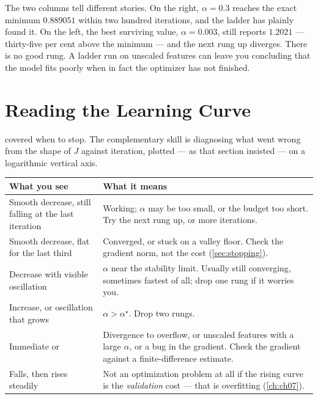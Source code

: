 The two columns tell different stories. On the right, $\alpha = 0.3$ reaches the
exact minimum $0.889051$ within two hundred iterations, and the ladder has
plainly found it. On the left, the best surviving value, $\alpha = 0.003$, still
reports $1.2021$ --- thirty-five per cent above the minimum --- and the next rung
up diverges. There is no good rung. A ladder run on unscaled features can leave
you concluding that the model fits poorly when in fact the optimizer has not
finished.

\section{Reading the Learning Curve}
\label{sec:learning-curve}

 covered when to stop. The complementary skill is diagnosing
what went wrong from the shape of $J$ against iteration, plotted --- as that
section insisted --- on a logarithmic vertical axis.

\begin{center}
\small
\renewcommand{\arraystretch}{1.3}
\begin{tabular}{@{}L{4.0cm}L{7.0cm}@{}}
\toprule
\textbf{What you see} & \textbf{What it means}\\
\midrule
Smooth decrease, still falling at the last iteration &
  Working; $\alpha$ may be too small, or the budget too short. Try the next rung
  up, or more iterations.\\
Smooth decrease, flat for the last third &
  Converged, or stuck on a valley floor. Check the gradient norm, not the cost
  (\cref{sec:stopping}).\\
Decrease with visible oscillation &
  $\alpha$ near the stability limit. Usually still converging, sometimes fastest
  of all; drop one rung if it worries you.\\
Increase, or oscillation that grows &
  $\alpha > \alpha^\star$. Drop two rungs.\\
Immediate  or  &
  Divergence to overflow, or unscaled features with a large $\alpha$, or a bug
  in the gradient. Check the gradient against a finite-difference estimate.\\
Falls, then rises steadily &
  Not an optimization problem at all if the rising curve is the \emph{validation}
  cost --- that is overfitting (\cref{ch:ch07}).\\
\bottomrule
\end{tabular}
\end{center}

